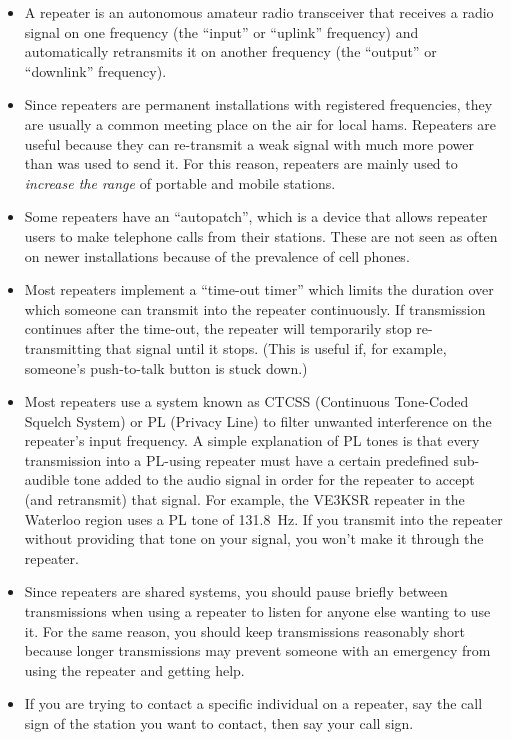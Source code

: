 \documentclass[letterpaper,12pt]{scrartcl}
\begin{document}
\begin{itemize}
\item A repeater is an autonomous amateur radio transceiver that receives a radio signal on one frequency (the ``input'' or ``uplink'' frequency)
and automatically retransmits it on another frequency (the ``output'' or ``downlink'' frequency).
\item Since repeaters are permanent installations with registered frequencies, they are usually a common meeting place on the air for local hams.
Repeaters are useful because they can re-transmit a weak signal with much more power than was used to send it. For this reason,
repeaters are mainly used to \textit{increase the range} of portable and mobile stations.
\item Some repeaters have an ``autopatch'', which is a device that allows repeater users to make telephone calls from their stations.
These are not seen as often on newer installations because of the prevalence of cell phones.
\item Most repeaters implement a ``time-out timer'' which limits the duration over which someone can transmit into the repeater continuously.
If transmission continues after the time-out, the repeater will temporarily stop re-transmitting that signal until it stops.
(This is useful if, for example, someone's push-to-talk button is stuck down.)
\item Most repeaters use a system known as CTCSS (Continuous Tone-Coded Squelch System) or PL (Privacy Line) to filter unwanted interference
on the repeater's input frequency. A simple explanation of PL tones is that every transmission into a PL-using repeater
must have a certain predefined sub-audible tone added to the audio signal in order for the repeater to accept (and retransmit) that signal.
For example, the VE3KSR repeater in the Waterloo region uses a PL tone of 131.8~Hz. If you transmit into the repeater without providing that tone
on your signal, you won't make it through the repeater.
\item Since repeaters are shared systems, you should pause briefly between transmissions when using a repeater to listen for anyone else wanting to use it.
For the same reason, you should keep transmissions reasonably short because longer transmissions may prevent someone with an emergency from using the repeater and getting help.
\item If you are trying to contact a specific individual on a repeater, say the call sign of the station you want to contact, then say your call sign.

\end{itemize}
\end{document}
